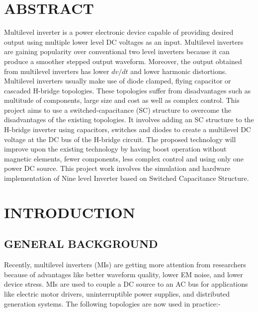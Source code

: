 \documentclass[12pt,a4paper]{report}
\begin{document}
\chapter*{ABSTRACT\centering}
Multilevel inverter is a power electronic device capable of providing desired output using multiple lower level DC voltages as an input. Multilevel inverters are gaining popularity over conventional two level inverters because it can produce a smoother stepped output waveform. Moreover, the output obtained from multilevel inverters has lower $dv/dt$ and lower harmonic distortions. Multilevel inverters usually make use of diode clamped, flying capacitor or cascaded H-bridge topologies. These topologies suffer from disadvantages such as multitude of components, large size and cost as well as complex control. This project aims to use a switched-capacitance (SC) structure to overcome the disadvantages of the existing topologies. It involves adding an SC structure to the H-bridge inverter using capacitors, switches and diodes to create a multilevel DC voltage at the DC bus of the H-bridge circuit. The proposed technology will improve upon the existing technology by having boost operation without magnetic elements, fewer components, less complex control and using only one power DC source. This project work involves the simulation and hardware implementation of Nine level Inverter based on Switched Capacitance Structure.
\thispagestyle{empty}
\clearpage

\tableofcontents
\clearpage
{}
\listoffigures
\clearpage
{}
\listoftables
\clearpage

\chapter{INTRODUCTION}

\section{GENERAL BACKGROUND}
\hspace{0.2cm} Recently, multilevel inverters (MIs) are getting more attention from researchers because of advantages like better waveform quality, lower EM noise, and lower device stress. MIs are used to couple a DC source to an AC bus for applications like electric motor drivers, uninterruptible power supplies, and distributed generation systems. The following topologies are now used in practice:-\\
\end{document}
